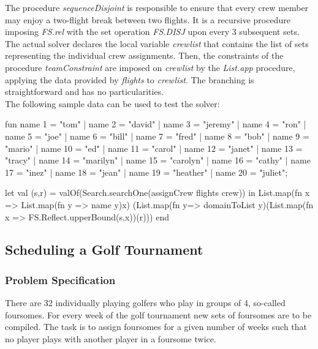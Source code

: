 \documentclass[a4paper]{scrartcl}
\begin{document}
The procedure {\it sequenceDisjoint} is responsible to ensure that every 
crew member may enjoy a two-flight break between two flights. It 
is a recursive procedure imposing {\it FS.rel} with the set operation
{\it FS.DISJ} upon every 3 subsequent sets. \\

The actual solver declares the local variable {\it crewlist} that 
contains the list of sets representing the individual crew 
assignments. Then, the constraints of the procedure {\it teamConstraint} 
are imposed on {\it crewlist} by the {\it List.app} procedure, 
applying the data provided by {\it flights} to {\it crewlist}. 
The branching is straightforward and has no particularities.\\ 

The following sample data can be used to test the solver:
\begin{myverbatim}
fun name 1 = "tom"
  | name 2 = "david"
  | name 3 = "jeremy"
  | name 4 = "ron"
  | name 5 = "joe"
  | name 6 = "bill"
  | name 7 = "fred"
  | name 8 = "bob"
  | name 9 = "mario"
  | name 10 = "ed"
  | name 11 = "carol"
  | name 12 = "janet"
  | name 13 = "tracy"
  | name 14 = "marilyn"
  | name 15 = "carolyn"
  | name 16 = "cathy"
  | name 17 = "inez"
  | name 18 = "jean"
  | name 19 = "heather"
  | name 20 = "juliet";

let 
    val (s,r) = valOf(Search.searchOne(assignCrew flights crew))
in  
    List.map(fn x => List.map(fn y => name y)x)
      (List.map(fn y=> domainToList y)(List.map(fn x => 
                            FS.Reflect.upperBound(s,x))(r)))
end
\end{myverbatim}



\newpage
\subsection{Scheduling a Golf Tournament}

\subsubsection{Problem Specification}
There are 32 individually playing golfers who play in 
groups of 4, so-called foursomes. For every week of the 
golf tournament new sets of foursomes are to be compiled. 
The task is to assign foursomes for a given number of weeks 
such that no player plays with another player in a foursome twice. 
\end{document}
